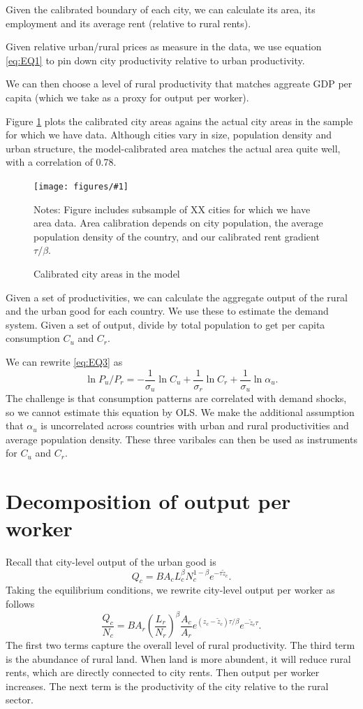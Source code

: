 \documentclass[12pt]{article}
\newcommand{\dofigure}[3]{\begin{figure}
\begin{centering}
\texttt{[image: figures/\#1]}
  \caption{#2\label{fig:#1}}
\end{centering}

\noindent \footnotesize{#3}
\end{figure}}
\begin{document}
Given the calibrated boundary of each city, we can calculate its area, its employment and its average rent (relative to rural rents). 

Given relative urban/rural prices as measure in the data, we use equation \eqref{eq:EQ1} to pin down city productivity relative to urban productivity.

We can then choose a level of rural productivity that matches aggreate GDP per capita (which we take as a proxy for output per worker).

Figure \ref{fig:../../research_designs/city_level_inputs/output/area_model_data} plots the calibrated city areas agains the actual city areas in the sample for which we have data. Although cities vary in size, population density and urban structure, the model-calibrated area matches the actual area quite well, with a correlation of 0.78. 

\dofigure{../../research_designs/city_level_inputs/output/area_model_data}{Calibrated city areas in the model}{Notes: Figure includes subsample of XX cities for which we have area data. Area calibration depends on city population, the average population density of the country, and our calibrated rent gradient $\tau/\beta$.}

Given a set of productivities, we can calculate the aggregate output of the rural and the urban good for each country. We use these to estimate the demand system. Given a set of output, divide by total population to get per capita consumption $C_u$ and $C_r$. 

We can rewrite \eqref{eq:EQ3} as 
\[
\ln P_u/P_r = -\frac 1 {\sigma_u}\ln C_u + \frac 1 {\sigma_r}\ln C_r + \frac 1 {\sigma_u}\ln\alpha_u.
\]
The challenge is that consumption patterns are correlated with demand shocks, so we cannot estimate this equation by OLS. We make the additional assumption that $\alpha_u$ is uncorrelated across countries with urban and rural productivities and average population density. These three varibales can then be used as instruments for $C_u$ and $C_r$.


\section{Decomposition of output per worker}
Recall that city-level output of the urban good is
\[
Q_c =
BA_cL_c^{\beta}N_c^{1-\beta}
 e^{-\tau\tilde z_c}.
\]
Taking the equilibrium conditions, we rewrite city-level output per worker as follows
\begin{equation}
\frac {Q_c}{N_c} =
B A_r 
\left(\frac 
	{L_r}{N_r}
\right)^\beta
\frac{A_c}{A_r}
e^{(z_c-\tilde z_c)\tau/\beta}
e^{-\tilde z_c\tau}.
\end{equation}
The first two terms capture the overall level of rural productivity. The third term is the abundance of rural land. When land is more abundent, it will reduce rural rents, which are directly connected to city rents. Then output per worker increases. The next term is the productivity of the city relative to the rural sector.
\end{document}
